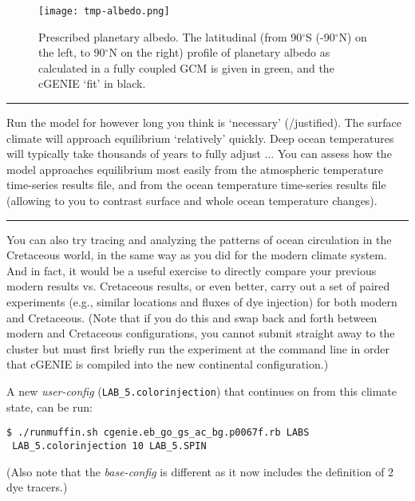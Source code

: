 \documentclass[11pt,fleqn]{book} %
\begin{document}
\begin{figure}
\texttt{[image: tmp-albedo.png]}\centering
\vspace{-6mm}
\caption{Prescribed planetary albedo. 
The latitudinal (from 90$^{\circ}$S (-90$^{\circ}$N) on the left, to 90$^{\circ}$N on the right) profile of planetary albedo as calculated in a fully coupled GCM is given in green, and the cGENIE ‘fit’ in black.}
\label{fig:tmp-albedo}
\end{figure}

\vspace{1mm}
\noindent\rule{4cm}{0.1mm}
\vspace{2mm}

\noindent Run the model for however long you think is ‘necessary’ (/justified). The surface climate will approach equilibrium ‘relatively’ quickly. Deep ocean temperatures will typically take thousands of years to fully adjust ... You can assess how the model approaches equilibrium most easily from the atmospheric temperature time-series results file, and from the ocean temperature time-series results file (allowing to you to contrast surface and whole ocean temperature changes).

\vspace{1mm}
\noindent\rule{4cm}{0.1mm}
\vspace{2mm}

\noindent You can also try tracing and analyzing the patterns of ocean circulation in the Cretaceous world, in the same way as you did for the modern climate system. And in fact, it would be a useful exercise to directly compare your previous modern results vs. Cretaceous results, or even better, carry out a set of paired experiments (e.g., similar locations and fluxes of dye injection) for both modern and Cretaceous. (Note that if you do this and swap back and forth between modern and Cretaceous configurations, you cannot submit straight away to the cluster but must first briefly run the experiment at the command line in order that cGENIE is compiled into the new continental configuration.)

A new \textit{user-config} (\texttt{LAB\_5.colorinjection}) that continues on from this climate state, can be run: 
\begin{verbatim}
$ ./runmuffin.sh cgenie.eb_go_gs_ac_bg.p0067f.rb LABS 
 LAB_5.colorinjection 10 LAB_5.SPIN 
\end{verbatim}
(Also note that the \textit{base-config} is different as it now includes the definition of 2 dye tracers.)
\end{document}
